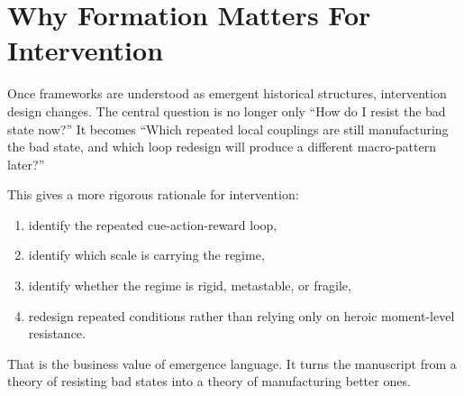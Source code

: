 \section{Why Formation Matters For Intervention}

Once frameworks are understood as emergent historical structures, intervention
design changes. The central question is no longer only ``How do I resist the
bad state now?'' It becomes ``Which repeated local couplings are still
manufacturing the bad state, and which loop redesign will produce a different
macro-pattern later?''

This gives a more rigorous rationale for intervention:
\begin{enumerate}[nosep]
  \item identify the repeated cue-action-reward loop,
  \item identify which scale is carrying the regime,
  \item identify whether the regime is rigid, metastable, or fragile,
  \item redesign repeated conditions rather than relying only on heroic
        moment-level resistance.
\end{enumerate}

That is the business value of emergence language. It turns the manuscript from
a theory of resisting bad states into a theory of manufacturing better ones.
